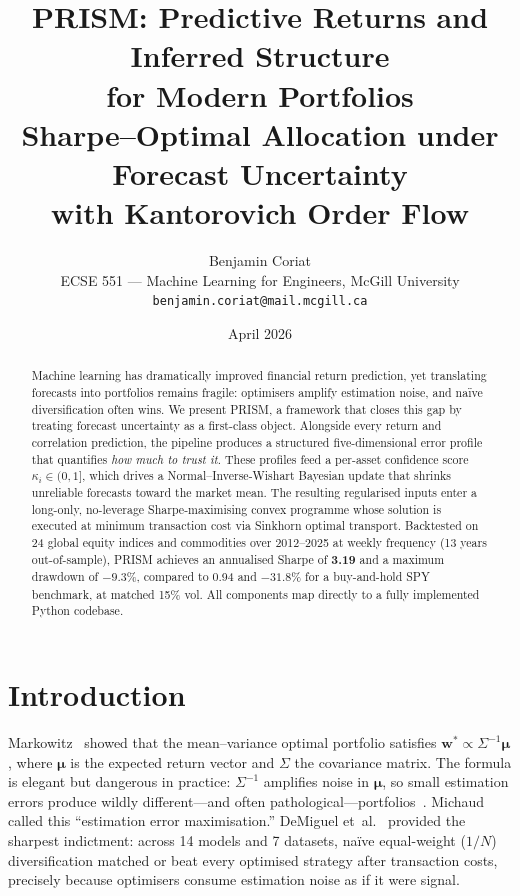 \documentclass[10pt,twocolumn]{article}
\title{\textbf{PRISM: Predictive Returns and Inferred Structure\\for Modern Portfolios}\\[4pt]
\large Sharpe--Optimal Allocation under Forecast Uncertainty\\with Kantorovich Order Flow}
\author{Benjamin Coriat\\
ECSE 551 --- Machine Learning for Engineers, McGill University\\
\texttt{benjamin.coriat@mail.mcgill.ca}}
\date{April 2026}
\newcommand{\bw}{\bm{w}}
\newcommand{\bmu}{\bm{\mu}}
\begin{document}
\maketitle

\begin{abstract}
Machine learning has dramatically improved financial return
prediction, yet translating forecasts into portfolios remains
fragile: optimisers amplify estimation noise, and na\"ive
diversification often wins.  We present PRISM, a framework that
closes this gap by treating forecast uncertainty as a first-class
object.  Alongside every return and correlation prediction, the
pipeline produces a structured five-dimensional error profile
that quantifies \emph{how much to trust it}.  These profiles feed
a per-asset confidence score $\kappa_i\in(0,1]$, which drives a
Normal--Inverse-Wishart Bayesian update that shrinks unreliable
forecasts toward the market mean.  The resulting regularised inputs
enter a long-only, no-leverage Sharpe-maximising convex programme
whose solution is executed at minimum transaction cost via Sinkhorn
optimal transport.  Backtested on 24 global equity indices and
commodities over 2012--2025 at weekly frequency (13 years
out-of-sample), PRISM achieves an annualised Sharpe of \textbf{3.19}
and a maximum drawdown of \textbf{$-9.3\%$}, compared to 0.94 and
$-31.8\%$ for a buy-and-hold SPY benchmark, at matched 15\% vol.
All components map directly to a fully implemented Python codebase.
\end{abstract}

\section{Introduction}\label{sec:intro}

Markowitz~\cite{markowitz1952} showed that the mean--variance
optimal portfolio satisfies $\bw^*\propto\Sigma^{-1}\bmu$,
where $\bmu$ is the expected return vector and $\Sigma$ the
covariance matrix.  The formula is elegant but dangerous in
practice: $\Sigma^{-1}$ amplifies noise in $\bmu$, so small
estimation errors produce wildly different---and often
pathological---portfolios~\cite{merton1980}.  Michaud~\cite{michaud1989}
called this ``estimation error maximisation.''
DeMiguel et~al.~\cite{demiguel2009} provided the sharpest
indictment: across 14 models and 7 datasets, na\"ive
equal-weight ($1/N$) diversification matched or beat every
optimised strategy after transaction costs, precisely because
optimisers consume estimation noise as if it were signal.
\end{document}
